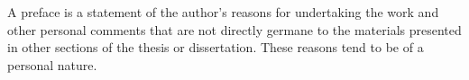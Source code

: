 \begin{preface}

A preface is a statement of the author's reasons for undertaking the work and other personal comments that are not directly germane to the materials presented in other sections of the thesis or dissertation. These reasons tend to be of a personal nature.

    \lipsum[6]

\end{preface}
